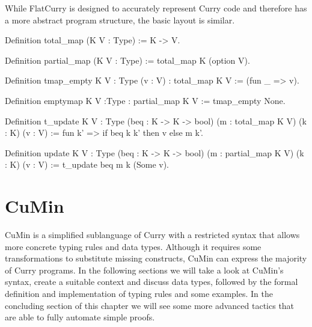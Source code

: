 \documentclass[fleqn, abstract=on]{scrreprt}
\begin{document}
\par
While FlatCurry is designed to accurately represent Curry code and therefore has a more abstract program structure, the basic layout is similar. 
\begin{coqcode}
Definition total_map (K V : Type) := K -> V.

Definition partial_map (K V : Type) := total_map K (option V).

Definition tmap_empty {K V : Type} (v : V) : total_map K V := (fun _ => v).

Definition emptymap {K V :Type} : partial_map K V := tmap_empty None.

Definition t_update {K V : Type} (beq : K -> K -> bool) (m : total_map K V) (k : K) (v : V) :=
fun k' => if beq k k' then v else m k'.

Definition update {K V : Type} (beq : K -> K -> bool) (m : partial_map K V) (k : K) (v : V) :=
t_update beq m k (Some v).
\end{coqcode}
\chapter{CuMin}
CuMin is a simplified sublanguage of Curry with a restricted syntax that allows more concrete typing rules and data types. Although it requires some transformations to substitute missing constructs, CuMin can express the majority of Curry programs. In the following sections we will take a look at CuMin's syntax\cite{p19mehner}, create a suitable context and discuss data types, followed by the formal definition and implementation of typing rules and some examples. In the concluding section of this chapter we will see some more advanced tactics that are able to fully automate simple proofs.
\end{document}
